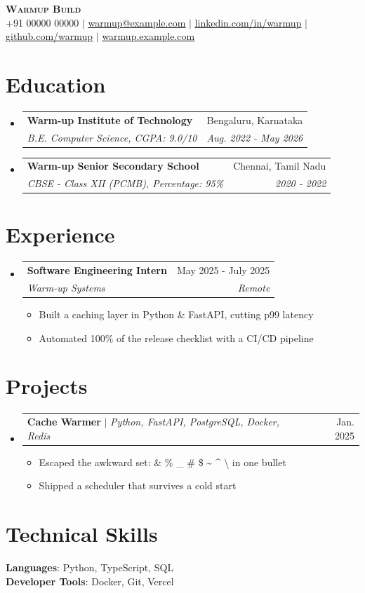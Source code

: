 \documentclass[letterpaper,11pt]{article}
\makeatletter
\newcommand{\resumeItem}[1]{
  \item\small{
    {#1 \vspace{-2pt}}
  }
}
\newcommand{\resumeSubheading}[4]{
  \vspace{-2pt}\item
    \begin{tabular*}{0.97\textwidth}[t]{l@{\extracolsep{\fill}}r}
      \textbf{#1} & #2 \\
      \textit{\small#3} & \textit{\small #4} \\
    \end{tabular*}\vspace{-7pt}
}
\newcommand{\resumeProjectHeading}[2]{
    \item
    \begin{tabular*}{0.97\textwidth}{l@{\extracolsep{\fill}}r}
      \small#1 & #2 \\
    \end{tabular*}\vspace{-7pt}
}
\newcommand{\resumeSubHeadingListStart}{\begin{itemize}[leftmargin=0.15in, label={}]}
\newcommand{\resumeSubHeadingListEnd}{\end{itemize}}
\newcommand{\resumeItemListStart}{\begin{itemize}}
\newcommand{\resumeItemListEnd}{\end{itemize}\vspace{-5pt}}
\makeatother
\begin{document}
\begin{center}
    \textbf{\Huge \scshape Warmup Build} \\ \vspace{1pt}
    \small +91 00000 00000 $|$
    \href{mailto:warmup@example.com}{\underline{warmup@example.com}} $|$
    \href{https://linkedin.com/in/warmup}{\underline{linkedin.com/in/warmup}} $|$
    \href{https://github.com/warmup}{\underline{github.com/warmup}} $|$
    \href{https://warmup.example.com}{\underline{warmup.example.com}}
\end{center}

\section{Education}
  \resumeSubHeadingListStart
    \resumeSubheading
      {Warm-up Institute of Technology}{Bengaluru, Karnataka}
      {B.E. Computer Science, CGPA: 9.0/10}{Aug. 2022 - May 2026}
    \resumeSubheading
      {Warm-up Senior Secondary School}{Chennai, Tamil Nadu}
      {CBSE - Class XII (PCMB), Percentage: 95\%}{2020 - 2022}
  \resumeSubHeadingListEnd

\section{Experience}
  \resumeSubHeadingListStart
    \resumeSubheading
      {Software Engineering Intern}{May 2025 - July 2025}
      {Warm-up Systems}{Remote}
      \resumeItemListStart
        \resumeItem{Built a caching layer in Python \& FastAPI, cutting p99 latency}
        \resumeItem{Automated 100\% of the release checklist with a CI/CD pipeline}
      \resumeItemListEnd
  \resumeSubHeadingListEnd

\section{Projects}
    \resumeSubHeadingListStart
      \resumeProjectHeading
          {\textbf{Cache Warmer} $|$ \emph{Python, FastAPI, PostgreSQL, Docker, Redis}}{Jan. 2025}
      \resumeItemListStart
        \resumeItem{Escaped the awkward set: \& \% \_ \# \$ \textasciitilde{} \textasciicircum{} \textbackslash{} in one bullet}
        \resumeItem{Shipped a scheduler that survives a cold start}
      \resumeItemListEnd
    \resumeSubHeadingListEnd

\section{Technical Skills}
 \begin{itemize}[leftmargin=0.15in, label={}]
    \small{\item{
     \textbf{Languages}{: Python, TypeScript, SQL} \\
     \textbf{Developer Tools}{: Docker, Git, Vercel}
    }}
 \end{itemize}

\end{document}
